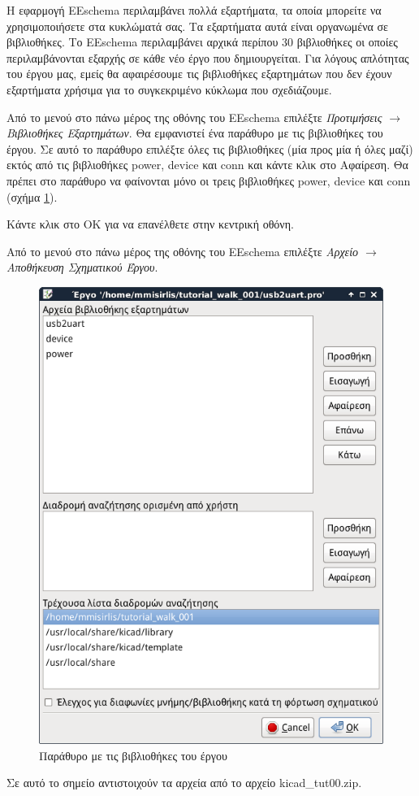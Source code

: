 \documentclass[a4paper]{article}
\begin{document}
Η εφαρμογή \textenglish{EEschema} περιλαμβάνει πολλά εξαρτήματα, τα οποία μπορείτε να χρησιμοποιήσετε στα κυκλώματά σας. Τα εξαρτήματα αυτά είναι οργανωμένα σε βιβλιοθήκες. Το \textenglish{EEschema} περιλαμβάνει αρχικά περίπου 30 βιβλιοθήκες οι οποίες περιλαμβάνονται εξαρχής σε κάθε νέο έργο που δημιουργείται. Για λόγους απλότητας του έργου μας, εμείς θα αφαιρέσουμε τις βιβλιοθήκες εξαρτημάτων που δεν έχουν εξαρτήματα χρήσιμα για το συγκεκριμένο κύκλωμα που σχεδιάζουμε.

Από το μενού στο πάνω μέρος της οθόνης του \textenglish{EEschema} επιλέξτε \textit{Προτιμήσεις $\rightarrow$ Βιβλιοθήκες Εξαρτημάτων}. Θα εμφανιστεί ένα παράθυρο με τις βιβλιοθήκες του έργου. Σε αυτό το παράθυρο επιλέξτε όλες τις βιβλιοθήκες (μία προς μία ή όλες μαζί) εκτός από τις βιβλιοθήκες power, device και conn και κάντε κλικ στο Αφαίρεση. Θα πρέπει στο παράθυρο να φαίνονται μόνο οι τρεις βιβλιοθήκες power, device και conn (σχήμα \ref{fig:eesch-dial-libr}). 

Κάντε κλικ στο ΟΚ για να επανέλθετε στην κεντρική οθόνη.

Από το μενού στο πάνω μέρος της οθόνης του \textenglish{EEschema} επιλέξτε \textit{Αρχείο $\rightarrow$ Αποθήκευση Σχηματικού Έργου}.

\begin{figure}
  \begin{center}
    \includegraphics[width=.5\textwidth]{img/eesch-dial-libr.png}
    \caption{Παράθυρο με τις βιβλιοθήκες του έργου}
    \label{fig:eesch-dial-libr}
  \end{center}
\end{figure}

Σε αυτό το σημείο αντιστοιχούν τα αρχεία από το αρχείο kicad\_tut00.zip.
\end{document}
